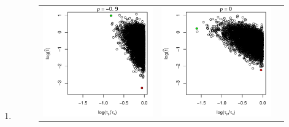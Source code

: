 \documentclass[10pt]{article}
\begin{document}
\begin{enumerate}
\item

  \begin{figure}
  \centering
  \begin{tabular}{ccc}
    \begin{minipage}{0.3\textwidth}
      \centering
      \includegraphics[width=1\linewidth]{small-sigma-t-scatterplot--09.pdf}
    \end{minipage}
    & \begin{minipage}{0.3\textwidth}
      \centering
      \includegraphics[width=1\linewidth]{small-sigma-t-scatterplot-0.pdf}

\end{minipage}
\end{tabular}
\end{figure}
\end{enumerate}
\end{document}
